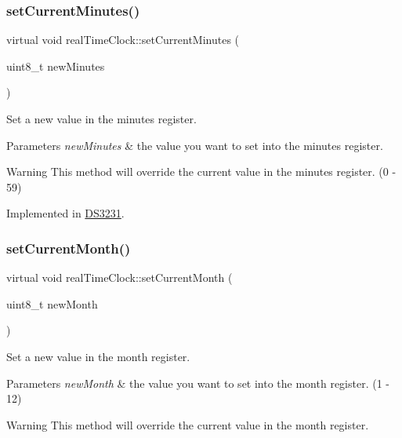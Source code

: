 \subsubsection{\texorpdfstring{set\+Current\+Minutes()}{setCurrentMinutes()}}
{\footnotesize\ttfamily virtual void real\+Time\+Clock\+::set\+Current\+Minutes (\begin{DoxyParamCaption}\item[{uint8\+\_\+t}]{new\+Minutes }\end{DoxyParamCaption})\hspace{0.3cm}{\ttfamily [pure virtual]}}



Set a new value in the minutes register. 


\begin{DoxyParams}{Parameters}
{\em new\+Minutes} & the value you want to set into the minutes register. \\
\hline
\end{DoxyParams}
\begin{DoxyWarning}{Warning}
This method will override the current value in the minutes register. (0 -\/ 59) 
\end{DoxyWarning}


Implemented in \mbox{\hyperlink{class_d_s3231_a221f92091b813108b3515f6676be29c8}{D\+S3231}}.

\mbox{\label{classreal_time_clock_a2edeb084630a78309bc574eceaf5d6ae}} 
\subsubsection{\texorpdfstring{set\+Current\+Month()}{setCurrentMonth()}}
{\footnotesize\ttfamily virtual void real\+Time\+Clock\+::set\+Current\+Month (\begin{DoxyParamCaption}\item[{uint8\+\_\+t}]{new\+Month }\end{DoxyParamCaption})\hspace{0.3cm}{\ttfamily [pure virtual]}}



Set a new value in the month register. 


\begin{DoxyParams}{Parameters}
{\em new\+Month} & the value you want to set into the month register. (1 -\/ 12) \\
\hline
\end{DoxyParams}
\begin{DoxyWarning}{Warning}
This method will override the current value in the month register. 
\end{DoxyWarning}


